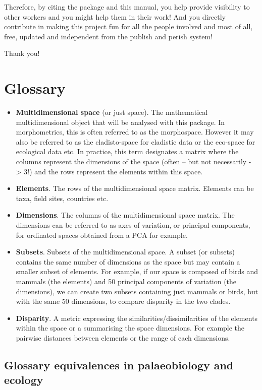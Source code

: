 \documentclass[
]{book}
\begin{document}
Therefore, by citing the package and this manual, you help provide visibility to other workers and you might help them in their work!
And you directly contribute in making this project fun for all the people involved and most of all, free, updated and independent from the publish and perish system!

Thank you!

\hypertarget{glossary}{%
\chapter{Glossary}\label{glossary}}

\begin{itemize}
\item
  \textbf{Multidimensional space} (or just space). The mathematical multidimensional object that will be analysed with this package.
  In morphometrics, this is often referred to as the morphospace.
  However it may also be referred to as the cladisto-space for cladistic data or the eco-space for ecological data etc.
  In practice, this term designates a matrix where the columns represent the dimensions of the space (often -- but not necessarily - \textgreater{} 3!) and the rows represent the elements within this space.
\item
  \textbf{Elements}. The rows of the multidimensional space matrix. Elements can be taxa, field sites, countries etc.
\item
  \textbf{Dimensions}. The columns of the multidimensional space matrix. The dimensions can be referred to as axes of variation, or principal components, for ordinated spaces obtained from a PCA for example.
\item
  \textbf{Subsets}. Subsets of the multidimensional space.
  A subset (or subsets) contains the same number of dimensions as the space but may contain a smaller subset of elements.
  For example, if our space is composed of birds and mammals (the elements) and 50 principal components of variation (the dimensions), we can create two subsets containing just mammals or birds, but with the same 50 dimensions, to compare disparity in the two clades.
\item
  \textbf{Disparity}. A metric expressing the similarities/dissimilarities of the elements within the space or a summarising the space dimensions. For example the pairwise distances between elements or the range of each dimensions.
\end{itemize}

\hypertarget{glossary-equivalences-in-palaeobiology-and-ecology}{%
\section{Glossary equivalences in palaeobiology and ecology}\label{glossary-equivalences-in-palaeobiology-and-ecology}}
\end{document}
